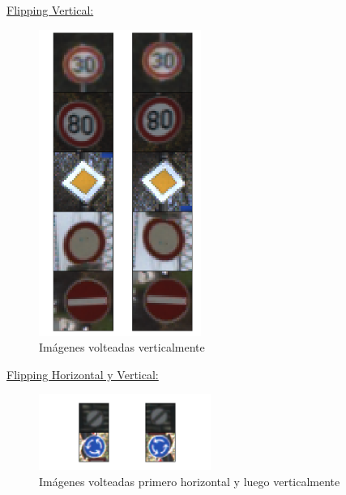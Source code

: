 \begin{multicols}{2}
				\underline{Flipping Vertical:}
				\begin{figure}[H]
					\begin{center}
					\includegraphics[height=10cm]{images/desarrollo/Augment/flippableVertically}
					\end{center}
					\begin{center}
					\caption{\small{Imágenes volteadas verticalmente}}
					
				{\small{\fontsize{10}{16.8}\selectfont {Fuente: Elaboración propia}}}
					\end{center}
					\vspace{-1.5em}
				\end{figure}

			\end{multicols}

			\underline{Flipping Horizontal y Vertical:}
			\begin{figure}[H]
				\begin{center}
				\includegraphics[width=0.5\textwidth, height=0.25\textheight]{images/desarrollo/Augment/flippable_both}
				\end{center}
				\vspace{-1.em}
				\begin{center}
				\caption{\small{Imágenes volteadas primero horizontal y luego verticalmente}}
				{\small{\fontsize{10}{16.8}\selectfont {Fuente: Elaboración propia}}}
				\end{center}
				\vspace{-1.5em}
			\end{figure}

